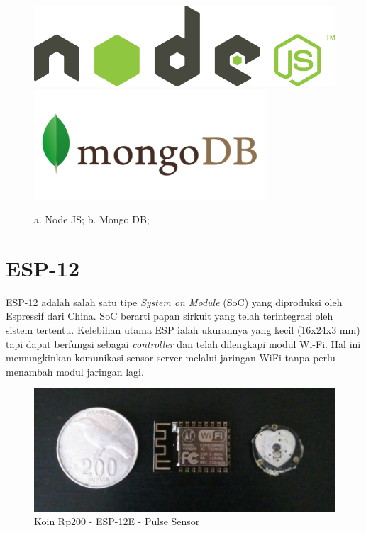 \begin{figure}[H]
    \centering
	\includegraphics[scale=0.15]{images/nodejs.png}
    \includegraphics[scale=0.3]{images/mongodb.png}
    \caption{a. Node JS; b. Mongo DB;}
\end{figure}

\section{ESP-12}
ESP-12 adalah salah satu tipe \textit{System on Module} (SoC) yang diproduksi oleh Espressif dari China. SoC berarti papan sirkuit yang telah terintegrasi oleh sistem tertentu. Kelebihan utama ESP ialah ukurannya yang kecil (16x24x3 mm) tapi dapat berfungsi sebagai \textit{controller} dan telah dilengkapi modul Wi-Fi. Hal ini memungkinkan komunikasi sensor-server melalui jaringan WiFi tanpa perlu menambah modul jaringan lagi.

\begin{figure}[H]
	\centering
	\includegraphics[scale=0.22]{images/coin_esp_pulse.jpg}
	\caption{Koin Rp200 - ESP-12E - Pulse Sensor}
	\label{fig:coin_esp_pulse}
\end{figure}

